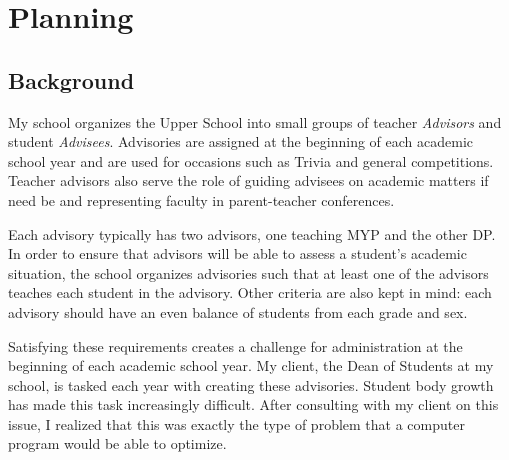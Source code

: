 \documentclass{paper}
\begin{document}
\insertTitlePage
{}
\tableofcontents
\thispagestyle{frontorback}
\newpage
\setcounter{page}{1}
\justifying

\section{Planning}
\label{sec:planning}
\subsection{Background}
My school organizes the Upper School into small groups of teacher \textit{Advisors} and student \textit{Advisees}.
Advisories are assigned at the beginning of each academic school year and are used for occasions such as Trivia and general competitions.
Teacher advisors also serve the role of guiding advisees on academic matters if need be and representing faculty in parent-teacher conferences.

Each advisory typically has two advisors, one teaching MYP and the other DP.
In order to ensure that advisors will be able to assess a student's academic situation, the school organizes advisories such that at least one of the advisors teaches each student in the advisory.
Other criteria are also kept in mind: each advisory should have an even balance of students from each grade and sex.

Satisfying these requirements creates a challenge for administration at the beginning of each academic school year.
My client, the Dean of Students at my school, is tasked each year with creating these advisories.
Student body growth has made this task increasingly difficult.
After consulting with my client on this issue, I realized that this was exactly the type of problem that a computer program would be able to optimize.
\end{document}
